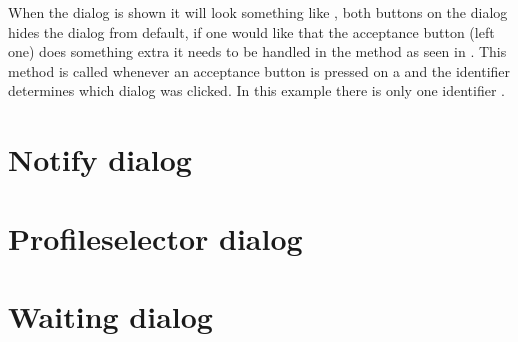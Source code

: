 

When the dialog is shown it will look something like , both buttons on the dialog hides the dialog from default, if one would like that the acceptance button (left one) does something extra it needs to be handled in the method as seen in . This method is called whenever an acceptance button is pressed on a  and the identifier  determines which dialog was clicked. In this example there is only one identifier .


\section{Notify dialog}
\label{sec:impl_notify_dialog}



\section{Profileselector dialog}
\label{sec:impl_profileselector_dialog}





\section{Waiting dialog}
\label{sec:impl_waiting_dialog}



